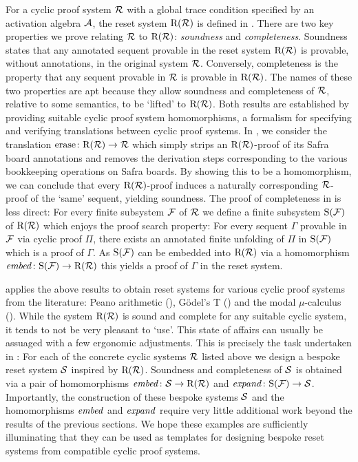 For a cyclic proof system $\mathcal{R}$ with a global
trace condition specified by an activation algebra $\mathcal{A}$, the reset system $\mathrm{R}(\mathcal{R})$ is defined in
. There are two key properties we prove relating $\mathcal{R}$ to
$\mathrm{R}(\mathcal{R})$: \emph{soundness} and \emph{completeness}. 
Soundness
states that any annotated sequent provable in the reset system $\mathrm{R}(\mathcal{R})$ is provable, without annotations, in the original system $\mathcal{R}$. Conversely, completeness is the property that any
sequent provable in $\mathcal{R}$ is provable in $\mathrm{R}(\mathcal{R})$.
The names of these two properties are apt because they allow soundness and
completeness of $\mathcal{R}$, relative to some semantics, to be `lifted' to
$\mathrm{R}(\mathcal{R})$.
Both results are established by providing suitable cyclic
proof system homomorphisms, a formalism for specifying and verifying
translations between cyclic proof systems. In , we consider the translation
$\mathrm{erase} \colon \mathrm{R}(\mathcal{R}) \to \mathcal{R}$ which simply strips an $\mathrm{R}(\mathcal{R})$-proof of its Safra
board annotations and removes the derivation steps corresponding to the various
bookkeeping operations on Safra boards. By showing this to be a homomorphism, we can
conclude that every $\mathrm{R}(\mathcal{R})$-proof induces a naturally corresponding $\mathcal{R}$-proof
of the `same' sequent, yielding soundness.
The proof of completeness in  is less direct: For every finite subsystem $\mathcal{F}$ of
$\mathcal{R}$ we define a finite subsystem $\mathrm{S}(\mathcal{F})$ of
$\mathrm{R}(\mathcal{R})$ which enjoys the proof search property: For every sequent $\Gamma$
provable in $\mathcal{F}$ via cyclic proof $\Pi$, there exists an annotated finite
unfolding of $\Pi$ in $\mathrm{S}(\mathcal{F})$ which is a proof of $\Gamma$. As $\mathrm{S}(\mathcal{F})$ can be
embedded into $\mathrm{R}(\mathcal{R})$ via a homomorphism $\mathit{embed} \colon \mathrm{S}(\mathcal{F}) \to \mathrm{R}(\mathcal{R})$ this
yields a proof of $\Gamma$ in the reset system.

 applies the above results to obtain reset systems for
various cyclic proof systems from the literature: Peano arithmetic
(), Gödel's T ()
and the modal $\mu$-calculus (). While the system $\mathrm{R}(\mathcal{R})$ is
sound and complete for any suitable cyclic system, it tends to not be very
pleasant to `use'. This state of affairs can usually be assuaged with a few
ergonomic adjustments. This is precisely the task undertaken in : For
each of the concrete cyclic systems $\mathcal{R}$ listed above we design a bespoke reset
system $\mathcal{S}$ inspired by $\mathrm{R}(\mathcal{R})$.
Soundness and completeness of \( \mathcal{S} \) is obtained via a pair of homomorphisms $\mathit{embed} \colon \mathcal{S} \to \mathrm{R}(\mathcal{R})$ and $\mathit{expand} \colon \mathrm{S}(\mathcal{F}) \to \mathcal{S}$.
Importantly,
the construction of these bespoke systems $\mathcal{S}$ and the homomorphisms $\mathit{embed}$
and $\mathit{expand}$ require very little additional work beyond the results of the
previous sections. We hope these examples are sufficiently illuminating that they can be used as templates for designing bespoke reset systems from compatible cyclic proof systems.

